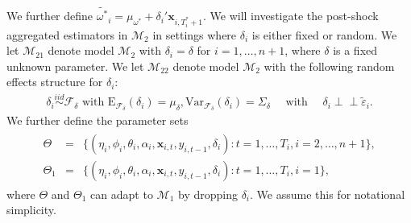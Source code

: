 \documentclass[11pt]{article}
\def\mbf#1{\mathbf{#1}} %
\newcommand{\simiid}{\stackrel{iid}{\sim}} %
\newcommand{\indep}{\perp \!\!\! \perp } %
\def\mrm#1{\mathrm{#1}} %
\def\t#1{\tilde{#1}} %
\def\mc#1{\mathcal{#1}} %
\def\mc#1{\mathcal{#1}}
\theoremstyle{definition}
\begin{document}
We further define 
$\widetilde{\omega^{*}}_i=\mu_{\omega^{*}}+\delta_i'\mbf{x}_{i, T_i^*+1}$. 
We will investigate the post-shock aggregated estimators in $\mc{M}_2$ 
in settings where $\delta_i$ is either fixed or random. 
We let $\mc{M}_{21}$ denote model $\mc{M}_{2}$ with $\delta_i = \delta$ for $i= 1, \ldots, n+1$, 
where $\delta$ is a  fixed unknown parameter.
We let $\mc{M}_{22}$ denote model $\mc{M}_{2}$ with the following random effects 
structure for $\delta_i$:
\begin{align*}
\delta_i\simiid  \mc{F}_{\delta} \text{ with }\mrm{E}_{\mc{F}_{\delta}}(\delta_i)=\mu_{\delta}, \mrm{Var}_{\mc{F}_{\delta}}(\delta_i)=\Sigma_\delta 
   \quad \text{ with } \quad  \delta_i  \indep \t{\varepsilon}_{i}.
\end{align*}
We further define the parameter sets
\begin{align}
  \begin{array}{lll}
     \Theta &= &\{(\eta_i, \phi_i, \theta_i, \alpha_i, \mbf{x}_{i,t}, y_{i,t-1}, \delta_i)\colon t= 1, \ldots, T_i, i = 2, \ldots, n +1\},\\
    \Theta_1 &= &\{(\eta_i, \phi_i, \theta_i, \alpha_i, \mbf{x}_{i,t}, y_{i,t-1}, \delta_i)\colon t= 1, \ldots, T_i, i = 1\},\label{parameter}
  \end{array}
\end{align}
where $\Theta$ and $\Theta_1$ can adapt to $\mc{M}_1$ by dropping $\delta_i$. We assume this for notational simplicity.














%

  
\end{document}

